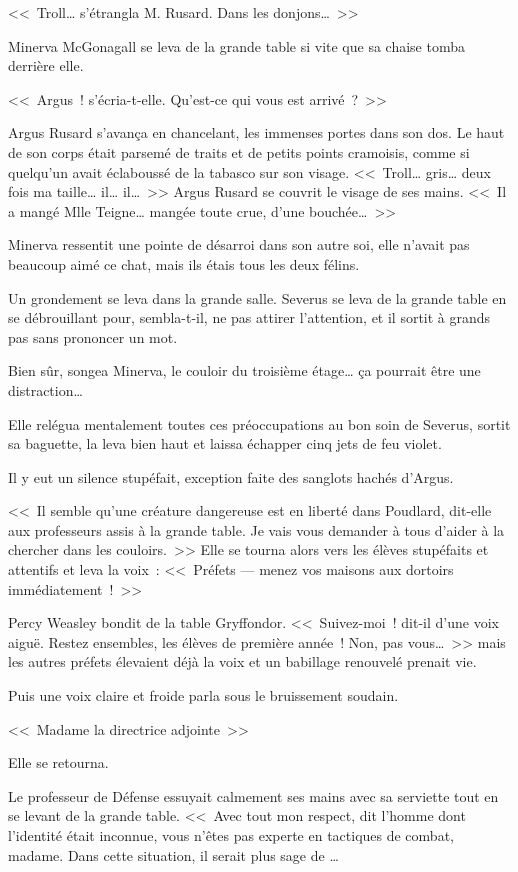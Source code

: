 <<~Troll… s'étrangla M. Rusard. Dans les donjons…~>>

Minerva McGonagall se leva de la grande table si vite que sa chaise tomba derrière elle.

<<~Argus~! s'écria-t-elle. Qu'est-ce qui vous est arrivé~?~>>

Argus Rusard s'avança en chancelant, les immenses portes dans son dos. Le haut de son corps était parsemé de traits et de petits points cramoisis, comme si quelqu'un avait éclaboussé de la tabasco sur son visage. <<~Troll… gris… deux fois ma taille… il… il…~>> Argus Rusard se couvrit le visage de ses mains. <<~Il a mangé Mlle Teigne… mangée toute crue, d'une bouchée…~>>

Minerva ressentit une pointe de désarroi dans son autre soi, elle n'avait pas beaucoup aimé ce chat, mais ils étais tous les deux félins.

Un grondement se leva dans la grande salle. Severus se leva de la grande table en se débrouillant pour, sembla-t-il, ne pas attirer l'attention, et il sortit à grands pas sans prononcer un mot.

Bien sûr, songea Minerva, le couloir du troisième étage… ça pourrait être une distraction…

Elle relégua mentalement toutes ces préoccupations au bon soin de Severus, sortit sa baguette, la leva bien haut et laissa échapper cinq jets de feu violet.

Il y eut un silence stupéfait, exception faite des sanglots hachés d'Argus.

<<~Il semble qu'une créature dangereuse est en liberté dans Poudlard, dit-elle aux professeurs assis à la grande table. Je vais vous demander à tous d'aider à la chercher dans les couloirs.~>> Elle se tourna alors vers les élèves stupéfaits et attentifs et leva la voix~: <<~Préfets — menez vos maisons aux dortoirs immédiatement~!~>>

Percy Weasley bondit de la table Gryffondor. <<~Suivez-moi~! dit-il d'une voix aiguë. Restez ensembles, les élèves de première année~! Non, pas vous…~>> mais les autres préfets élevaient déjà la voix et un babillage renouvelé prenait vie.

Puis une voix claire et froide parla sous le bruissement soudain.

<<~Madame la directrice adjointe~>>

Elle se retourna.

Le professeur de Défense essuyait calmement ses mains avec sa serviette tout en se levant de la grande table. <<~Avec tout mon respect, dit l'homme dont l'identité était inconnue, vous n'êtes pas experte en tactiques de combat, madame. Dans cette situation, il serait plus sage de …

